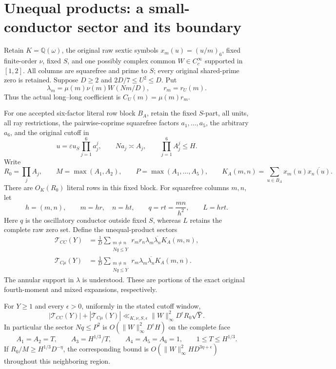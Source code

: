 \section{Unequal products: a small-conductor sector and its boundary}
\label{upq:core}
Retain $K=\mathbb Q(\omega)$, the original raw sextic symbols
$x_m(u)=(u/m)_6$, fixed finite-order $\nu$, fixed $S$, and one possibly
complex common $W\in C_c^\infty$ supported in $[1,2]$.
All columns are squarefree and prime to $S$; every original shared-prime
zero is retained. Suppose $D\ge2$ and $2D/7\le U^2\le D$. Put
\[
 \lambda_m=\mu(m)\nu(m)W(Nm/D),\qquad r_m=r_U(m).
\]
Thus the actual long--long coefficient is $C_U(m)=\mu(m)r_m$.

For one accepted six-factor literal row block $B_A$, retain the fixed
$S$-part, all units, all ray restrictions, the pairwise-coprime squarefree
factors $a_1,\ldots,a_5$, the arbitrary $a_6$, and the original cutoff in
\[
 u=\varepsilon u_S\prod_{j=1}^6a_j^j,\qquad
 Na_j\asymp A_j,\qquad \prod_{j=1}^6A_j^j\le H.
\]
Write
\[
 R_0=\prod_jA_j,\qquad M=\max(A_1,A_2),\qquad
 P=\max(A_1,\ldots,A_5),\qquad
 K_A(m,n)=\sum_{u\in B_A}x_m(u)\overline{x_n(u)}.
\]
There are $O_K(R_0)$ literal rows in this fixed block. For squarefree
columns $m,n$, let
\[
 h=(m,n),\qquad m=hr,\quad n=ht,\qquad
 q=rt=\frac{mn}{h^2},\qquad L=hrt.
\]
Here $q$ is the oscillatory conductor outside fixed $S$, whereas $L$
retains the complete raw zero set. Define the unequal-product sectors
\begin{align*}
 \mathcal T_{CC}(Y)
 &=\frac1D\sum_{\substack{m\ne n\\Nq\le Y}}
       r_mr_n\lambda_m\overline{\lambda_n}K_A(m,n),\\
 \mathcal T_{C\mu}(Y)
 &=\frac1D\sum_{\substack{m\ne n\\Nq\le Y}}
       r_m\lambda_m\overline{\lambda_n}K_A(m,n).
\end{align*}
The annular support in $\lambda$ is understood. These are portions of the
exact original fourth-moment and mixed expansions, respectively.

\begin{proposition}
\label{upq:small}
For $Y\ge1$ and every $\epsilon>0$, uniformly in the stated cutoff window,
\begin{equation}\label{upq:sc}
 |\mathcal T_{CC}(Y)|+|\mathcal T_{C\mu}(Y)|
 \ll_{K,\nu,S,\epsilon}
 \|W\|_\infty^2D^\epsilon R_0\sqrt Y.
\end{equation}
In particular the sector $Nq\le P^2$ is
$O(\|W\|_\infty^2D^\epsilon H)$ on the complete face
\begin{equation}\label{upq:face}
 A_1=A_2=T,\qquad A_3=H^{1/3}/T,\qquad
 A_4=A_5=A_6=1,\qquad 1\le T\le H^{1/3}.
\end{equation}
If $R_0/M\ge H^{1/3}D^{-\eta}$, the corresponding bound is
$O(\|W\|_\infty^2H D^{3\eta+\epsilon})$ throughout this neighboring region.
\end{proposition}

